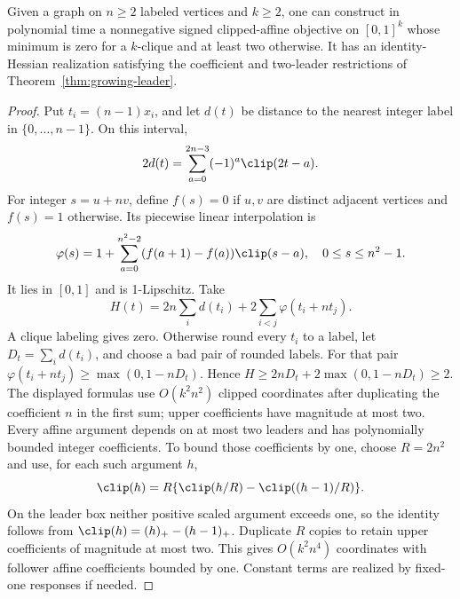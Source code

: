\begin{proposition}\label{prop:mixed-radix}
Given a graph on \(n\ge2\) labeled vertices and \(k\ge2\), one can construct in
polynomial time a nonnegative signed clipped-affine objective on \([0,1]^k\)
whose minimum is zero for a \(k\)-clique and at least two otherwise. It has an
identity-Hessian realization satisfying the coefficient and two-leader
restrictions of Theorem~\ref{thm:growing-leader}.
\end{proposition}
\begin{proof}
Put \(t_i=(n-1)x_i\), and let \(d(t)\) be distance to the nearest integer label
in \(\{0,\ldots,n-1\}\). On this interval,
\[
 2d(t)=\sum_{a=0}^{2n-3}(-1)^a\clip(2t-a).
\]
For integer \(s=u+nv\), define \(f(s)=0\) if \(u,v\) are distinct adjacent
vertices and \(f(s)=1\) otherwise. Its piecewise linear interpolation is
\[
 \varphi(s)=1+\sum_{a=0}^{n^2-2}(f(a+1)-f(a))\clip(s-a),
 \quad 0\le s\le n^2-1.
\]
It lies in \([0,1]\) and is 1-Lipschitz. Take
\[
 H(t)=2n\sum_i d(t_i)+2\sum_{i<j}\varphi(t_i+nt_j).
\]
A clique labeling gives zero. Otherwise round every \(t_i\) to a label, let
\(D_t=\sum_i d(t_i)\), and choose a bad pair of rounded labels. For that pair
\(\varphi(t_i+nt_j)\ge\max(0,1-nD_t)\). Hence
\(H\ge2nD_t+2\max(0,1-nD_t)\ge2\).
The displayed formulas use \(O(k^2n^2)\) clipped coordinates after duplicating
the coefficient \(n\) in the first sum; upper coefficients have magnitude at
most two. Every affine argument depends on at most two leaders and has
polynomially bounded integer coefficients. To bound those coefficients by one,
choose \(R=2n^2\) and use, for each such argument \(h\),
\[
 \clip(h)=R\{\clip(h/R)-\clip((h-1)/R)\}.
\]
On the leader box neither positive scaled argument exceeds one, so the
identity follows from \(\clip(h)=(h)_+-(h-1)_+\). Duplicate \(R\) copies to
retain upper coefficients of magnitude at most two. This gives
\(O(k^2n^4)\) coordinates with follower affine coefficients bounded by one.
Constant terms are realized by fixed-one responses if needed.
\end{proof}

